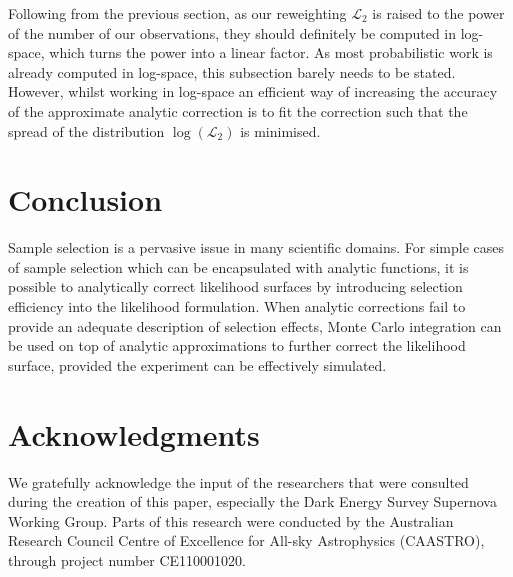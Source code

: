 \documentclass[a4paper,fleqn,usenatbib]{mnras}
\newcommand{\green}{\color{ForestGreen}}
\begin{document}
Following from the previous section, as our reweighting $\mathcal{L}_2$ is raised to the power of the number of our observations, they should definitely be computed in log-space, which turns the power into a linear factor. As most probabilistic work is already computed in log-space, this subsection barely needs to be stated. However, whilst working in log-space an efficient way of increasing the accuracy of the approximate analytic correction is to fit the correction such that the spread of the distribution $\log\left(\mathcal{L}_2\right)$ is minimised. 














\section{Conclusion}
\label{sec:conclusion}


Sample selection is a pervasive issue in many scientific domains. For simple cases of sample selection which can be encapsulated with analytic functions, it is possible to analytically correct likelihood surfaces by introducing selection efficiency into the likelihood formulation. When analytic corrections fail to provide an adequate description of selection effects, Monte Carlo integration can be used on top of analytic approximations to further correct the likelihood surface, provided the experiment can be effectively simulated. 



\section*{Acknowledgments}

We gratefully acknowledge the input of the researchers that were consulted during the creation of this paper, especially the Dark Energy Survey Supernova Working Group. {\green Parts of this research were conducted by the Australian Research Council Centre of Excellence for All-sky Astrophysics (CAASTRO), through project number CE110001020.}




\bsp	%
\label{lastpage}
\end{document}
